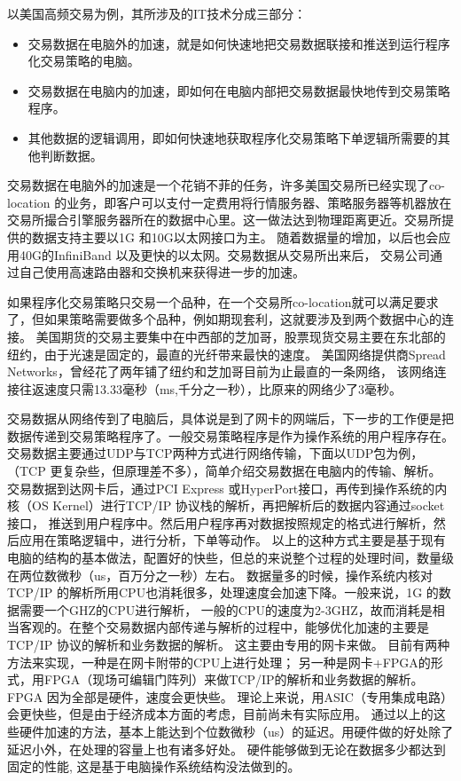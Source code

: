 以美国高频交易为例，其所涉及的IT技术分成三部分：
\begin{itemize}
\item 交易数据在电脑外的加速，就是如何快速地把交易数据联接和推送到运行程序化交易策略的电脑。
\item 交易数据在电脑内的加速，即如何在电脑内部把交易数据最快地传到交易策略程序。
\item 其他数据的逻辑调用，即如何快速地获取程序化交易策略下单逻辑所需要的其他判断数据。
\end{itemize}	 
交易数据在电脑外的加速是一个花销不菲的任务，许多美国交易所已经实现了co-location 的业务，即客户可以支付一定费用将行情服务器、策略服务器等机器放在
交易所撮合引擎服务器所在的数据中心里。这一做法达到物理距离更近。交易所提供的数据支持主要以1G 和10G以太网接口为主。
随着数据量的增加，以后也会应用40G的InfiniBand 以及更快的以太网。交易数据从交易所出来后，
交易公司通过自己使用高速路由器和交换机来获得进一步的加速。
	  
如果程序化交易策略只交易一个品种，在一个交易所co-location就可以满足要求了，但如果策略需要做多个品种，例如期现套利，这就要涉及到两个数据中心的连接。
美国期货的交易主要集中在中西部的芝加哥，股票现货交易主要在东北部的纽约，由于光速是固定的，最直的光纤带来最快的速度。
美国网络提供商Spread Networks，曾经花了两年铺了纽约和芝加哥目前为止最直的一条网络，
该网络连接往返速度只需13.33毫秒（ms,千分之一秒），比原来的网络少了3毫秒。
	   
交易数据从网络传到了电脑后，具体说是到了网卡的网端后，下一步的工作便是把数据传递到交易策略程序了。一般交易策略程序是作为操作系统的用户程序存在。
交易数据主要通过UDP与TCP两种方式进行网络传输，下面以UDP包为例，（TCP 更复杂些，但原理差不多），简单介绍交易数据在电脑内的传输、解析。
交易数据到达网卡后，通过PCI Express 或HyperPort接口，再传到操作系统的内核（OS Kernel）进行TCP/IP 协议栈的解析，再把解析后的数据内容通过socket 接口，
推送到用户程序中。然后用户程序再对数据按照规定的格式进行解析，然后应用在策略逻辑中，进行分析，下单等动作。
以上的这种方式主要是基于现有电脑的结构的基本做法，配置好的快些，但总的来说整个过程的处理时间，数量级在两位数微秒（us，百万分之一秒）左右。
数据量多的时候，操作系统内核对TCP/IP 的解析所用CPU也消耗很多，处理速度会加速下降。一般来说，1G 的数据需要一个GHZ的CPU进行解析，
一般的CPU的速度为2-3GHZ，故而消耗是相当客观的。在整个交易数据内部传递与解析的过程中，能够优化加速的主要是TCP/IP 协议的解析和业务数据的解析。
这主要由专用的网卡来做。
目前有两种方法来实现，一种是在网卡附带的CPU上进行处理；
另一种是网卡+FPGA的形式，用FPGA（现场可编辑门阵列）来做TCP/IP的解析和业务数据的解析。 FPGA 因为全部是硬件，速度会更快些。
理论上来说，用ASIC（专用集成电路）会更快些，但是由于经济成本方面的考虑，目前尚未有实际应用。 
通过以上的这些硬件加速的方法，基本上能达到个位数微秒（us）的延迟。用硬件做的好处除了延迟小外，在处理的容量上也有诸多好处。
硬件能够做到无论在数据多少都达到固定的性能, 这是基于电脑操作系统结构没法做到的。
	    
